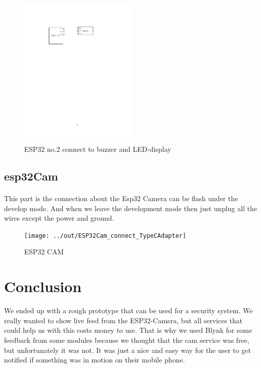 \documentclass[12pt]{article}        %
\begin{document}
    \begin{figure}[h]
        \caption{ESP32 no.2 connect to buzzer and LED-display}\label{fig:figure3}
        \centering
        \includegraphics[width=0.5\textwidth]{../out/ESP32_No.2_connect_Buzzer}
    \end{figure}

    \pagebreak
    \subsection{esp32Cam}\label{subsec:esp32cam}
    \paragraph{}
    This part is the connection about the Esp32 Camera can be flash under the develop mode.
    And when we leave the development mode then just unplug all the wires except the power and ground.

    \blindtext{}

    \begin{figure}[h]
        \caption{ESP32 CAM}\label{fig:figure4}
        \centering
        \texttt{[image: ../out/ESP32Cam\_connect\_TypeCAdapter]}
    \end{figure}

    \pagebreak
    \section{Conclusion}\label{sec:conclusion}

    We ended up with a rough prototype that can be used for a security system.
    We really wanted to show live feed from the ESP32-Camera, but all services that could help us with this costs money to use.
    That is why we used Blynk for some feedback from some modules because we thought that the cam service was free,
    but unfortunately it was not.
    It was just a nice and easy way for the user to get notified if something
    was in motion on their mobile phone.
\end{document}
